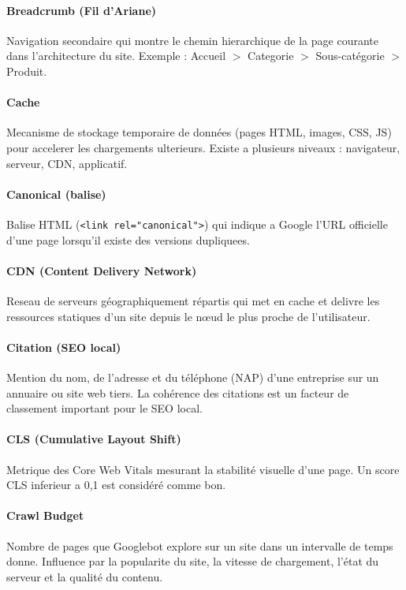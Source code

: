 \documentclass[12pt,a4paper,twoside]{report}
\begin{document}
\paragraph*{Breadcrumb (Fil d'Ariane)}
Navigation secondaire qui montre le chemin hierarchique de la page courante dans l'architecture du site. Exemple : Accueil $>$ Categorie $>$ Sous-catégorie $>$ Produit.

\paragraph*{Cache}
Mecanisme de stockage temporaire de données (pages HTML, images, CSS, JS) pour accelerer les chargements ulterieurs. Existe a plusieurs niveaux : navigateur, serveur, CDN, applicatif.

\paragraph*{Canonical (balise)}
Balise HTML (\texttt{<link rel="canonical">}) qui indique a Google l'URL officielle d'une page lorsqu'il existe des versions dupliquees.

\paragraph*{CDN (Content Delivery Network)}
Reseau de serveurs géographiquement répartis qui met en cache et delivre les ressources statiques d'un site depuis le nœud le plus proche de l'utilisateur.

\paragraph*{Citation (SEO local)}
Mention du nom, de l'adresse et du téléphone (NAP) d'une entreprise sur un annuaire ou site web tiers. La cohérence des citations est un facteur de classement important pour le SEO local.

\paragraph*{CLS (Cumulative Layout Shift)}
Metrique des Core Web Vitals mesurant la stabilité visuelle d'une page. Un score CLS inferieur a 0,1 est considéré comme bon.

\paragraph*{Crawl Budget}
Nombre de pages que Googlebot explore sur un site dans un intervalle de temps donne. Influence par la popularite du site, la vitesse de chargement, l'état du serveur et la qualité du contenu.
\end{document}
